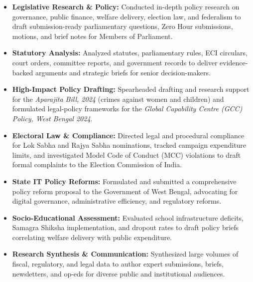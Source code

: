 \begin{itemize}[leftmargin=*, noitemsep]
    \item \textbf{Legislative Research \& Policy:} Conducted in-depth policy research on governance, public finance, welfare delivery, election law, and federalism to draft submission-ready parliamentary questions, Zero Hour submissions, motions, and brief notes for Members of Parliament.
    \item \textbf{Statutory Analysis:} Analyzed statutes, parliamentary rules, ECI circulars, court orders, committee reports, and government records to deliver evidence-backed arguments and strategic briefs for senior decision-makers.
    \item \textbf{High-Impact Policy Drafting:} Spearheaded drafting and research support for the \textit{Aparajita Bill, 2024} (crimes against women and children) and formulated legal-policy frameworks for the \textit{Global Capability Centre (GCC) Policy, West Bengal 2024}.
    \item \textbf{Electoral Law \& Compliance:} Directed legal and procedural compliance for Lok Sabha and Rajya Sabha nominations, tracked campaign expenditure limits, and investigated Model Code of Conduct (MCC) violations to draft formal complaints to the Election Commission of India.
    \item \textbf{State IT Policy Reforms:} Formulated and submitted a comprehensive policy reform proposal to the Government of West Bengal, advocating for digital governance, administrative efficiency, and regulatory reforms.
    \item \textbf{Socio-Educational Assessment:} Evaluated school infrastructure deficits, Samagra Shiksha implementation, and dropout rates to draft policy briefs correlating welfare delivery with public expenditure.
    \item \textbf{Research Synthesis \& Communication:} Synthesized large volumes of fiscal, regulatory, and legal data to author expert submissions, briefs, newsletters, and op-eds for diverse public and institutional audiences.
\end{itemize}
